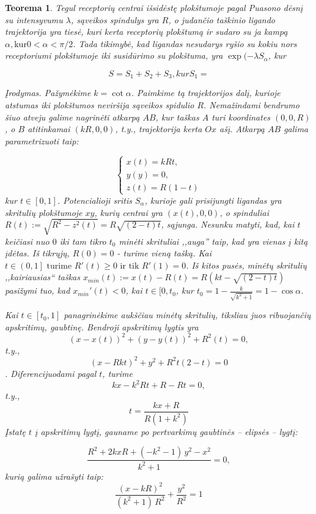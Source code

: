 \documentclass[10pt]{article}
\newtheorem{thm}{Teorema}
\begin{document}
\begin{thm}\label{thm:3}
Tegul receptorių centrai išsidėstę plokštumoje  pagal Puasono dėsnį su intensyvumu $\lambda$,  sąveikos spindulys yra $R$, o judančio taškinio ligando trajektorija yra  tiesė, kuri kerta receptorių plokštumą ir sudaro su ja kampą $\alpha, \mbox{kur} 0 < \alpha < \pi/2 $. Tada  tikimybė, kad ligandas nesudarys ryšio su kokiu nors receptoriumi plokštumoje iki susidūrimo su plokštuma, yra $ \exp( -\lambda S_{\alpha} $, kur 

\[
S = S_1 + S_2 + S_3,
kur S_1 = 
\]

Įrodymas. Pažymėkime $ k = \cot \alpha $. Paimkime tą trajektorijos dalį, kurioje atstumas iki plokštumos neviršija sąveikos spidulio  $ R $. Nemažindami bendrumo šiuo atveju galime nagrinėti atkarpą $ AB $, kur taškas $ A $ turi koordinates $ (0,0,R) $, o $ B $ atitinkamai  $ (kR,0,0) $, t.y., trajektorija kerta $ Ox $ ašį. Atkarpą  $ AB $ galima parametrizuoti taip:

\[
\begin{cases}
x(t) = kRt, \\
y(y) = 0, \\
z(t) = R(1-t)
\end{cases}
\]
kur $ t \in [0,1] $. Potencialioji sritis $ S_{\alpha} $, kurioje gali prisijungti ligandas yra skritulių plokštumoje $ xy $, kurių centrai yra $ (x(t),0,0)$, o spinduliai $ R(t):=\sqrt{R^2-z^2(t)}=R\sqrt{(2-t)t} $, sąjunga.
Nesunku matyti, kad, kai $ t $ keičiasi nuo $ 0 $ iki tam tikro $ t_0 $ minėti skrituliai ,,auga'' taip, kad yra vienas į kitą įdėtas. 
Iš tikrųjų, $ R(0)=0 $ - turime vieną tašką. Kai $ t \in \left( 0,1 \right] \mbox{ turime } R'(t) \geq 0 \mbox{ ir tik } R'(1)=0 $. Iš kitos pusės, minėtų skritulių ,,kairiausias`` taškas $ x_{min}(t) := x(t) - R(t) = R(kt-\sqrt{(2-t)t}) $ pasižymi tuo, kad $ x_{min}'(t) < 0 $, kai $ t \in [0, t_{0} $, kur 
$ t_{0} = 1 - \frac{k}{\sqrt{k^2+1}} = 1 - \cos \alpha  $.

Kai $ t \in [t_{0}, 1] $ panagrinėkime aukščiau minėtų skritulių, tiksliau juos ribuojančių apskritimų, gaubtinę. Bendroji apskritimų lygtis yra
$$ (x-x(t))^2 + (y-y(t))^2 + R^2(t) = 0, $$ 
t.y.,
$$ (x-Rkt)^2 + y^2 + R^2t(2-t) = 0 $$. 
Diferencijuodami pagal $ t $, turime 
$$ kx-k^2Rt+R-Rt = 0,  $$
t.y.,
$$
	t=\frac{kx+R}{R(1+k^2)}
$$
Įstatę $ t $ į apskritimų lygtį, gauname po pertvarkimų gaubtinės -- elipsės -- lygtį:

\[\frac{{R}^{2}+2kxR+\left( -{k}^{2}-1\right) \,{y}^{2}-{x}^{2}}{{k}^{2}+1}=0, \]
kurią galima užrašyti taip:
\[\frac{{\left( x-kR\right) }^{2}}{\left( {k}^{2}+1\right) \,{R}^{2}}+\frac{{y}^{2}}{{R}^{2}}=1\]





\end{thm}
\end{document}
